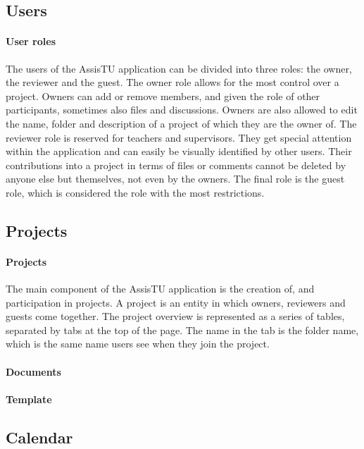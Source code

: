 \subsection{Users}

\paragraph{User roles}

The users of the AssisTU application can be divided into three roles: the owner, the reviewer and the guest. The owner role allows for the most control over a project. 
Owners can add or remove members, and given the role of other participants, sometimes also files and discussions. Owners are also allowed to edit the name, folder and description of a project of which they are the owner of. 
The reviewer role is reserved for teachers and supervisors. They get special attention within the application and can easily be visually identified by other users. Their contributions into a project in terms of files or comments cannot be deleted by anyone else but themselves, not even by the owners. 
The final role is the guest role, which is considered the role with the most restrictions.

\subsection{Projects}

\paragraph{Projects}

The main component of the AssisTU application is the creation of, and participation in projects. A project is an entity in which owners, reviewers and guests come together. 
The project overview is represented as a series of tables, separated by tabs at the top of the page. The name in the tab is the folder name, which is the same name users see when they join the project. 

\paragraph{Documents}

\paragraph{Template}

\subsection{Calendar}

